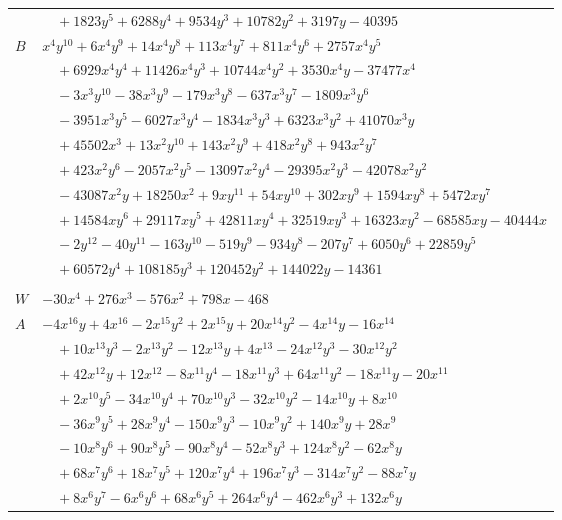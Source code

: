 \documentclass[11pt]{article}
\begin{document}
\begin{longtable}{@{}ll@{}}
 & $\quad +1823y^{5}+6288y^{4}+9534y^{3}+10782y^{2}+3197y-40395$\\
$B$ & $x^{4}y^{10}+6x^{4}y^{9}+14x^{4}y^{8}+113x^{4}y^{7}+811x^{4}y^{6}+2757x^{4}y^{5}$\\
 & $\quad +6929x^{4}y^{4}+11426x^{4}y^{3}+10744x^{4}y^{2}+3530x^{4}y-37477x^{4}$\\
 & $\quad -3x^{3}y^{10}-38x^{3}y^{9}-179x^{3}y^{8}-637x^{3}y^{7}-1809x^{3}y^{6}$\\
 & $\quad -3951x^{3}y^{5}-6027x^{3}y^{4}-1834x^{3}y^{3}+6323x^{3}y^{2}+41070x^{3}y$\\
 & $\quad +45502x^{3}+13x^{2}y^{10}+143x^{2}y^{9}+418x^{2}y^{8}+943x^{2}y^{7}$\\
 & $\quad +423x^{2}y^{6}-2057x^{2}y^{5}-13097x^{2}y^{4}-29395x^{2}y^{3}-42078x^{2}y^{2}$\\
 & $\quad -43087x^{2}y+18250x^{2}+9xy^{11}+54xy^{10}+302xy^{9}+1594xy^{8}+5472xy^{7}$\\
 & $\quad +14584xy^{6}+29117xy^{5}+42811xy^{4}+32519xy^{3}+16323xy^{2}-68585xy-40444x$\\
 & $\quad -2y^{12}-40y^{11}-163y^{10}-519y^{9}-934y^{8}-207y^{7}+6050y^{6}+22859y^{5}$\\
 & $\quad +60572y^{4}+108185y^{3}+120452y^{2}+144022y-14361$\\
\addlinespace[3pt]
\multicolumn{2}{@{}l}{$g=2$, $i=9$, $m=1$, neighbours $44,4,6,20,23,24,27,30,35,36,38,39,41$}\\
$W$ & $-30x^{4}+276x^{3}-576x^{2}+798x-468$\\
$A$ & $-4x^{16}y+4x^{16}-2x^{15}y^{2}+2x^{15}y+20x^{14}y^{2}-4x^{14}y-16x^{14}$\\
 & $\quad +10x^{13}y^{3}-2x^{13}y^{2}-12x^{13}y+4x^{13}-24x^{12}y^{3}-30x^{12}y^{2}$\\
 & $\quad +42x^{12}y+12x^{12}-8x^{11}y^{4}-18x^{11}y^{3}+64x^{11}y^{2}-18x^{11}y-20x^{11}$\\
 & $\quad +2x^{10}y^{5}-34x^{10}y^{4}+70x^{10}y^{3}-32x^{10}y^{2}-14x^{10}y+8x^{10}$\\
 & $\quad -36x^{9}y^{5}+28x^{9}y^{4}-150x^{9}y^{3}-10x^{9}y^{2}+140x^{9}y+28x^{9}$\\
 & $\quad -10x^{8}y^{6}+90x^{8}y^{5}-90x^{8}y^{4}-52x^{8}y^{3}+124x^{8}y^{2}-62x^{8}y$\\
 & $\quad +68x^{7}y^{6}+18x^{7}y^{5}+120x^{7}y^{4}+196x^{7}y^{3}-314x^{7}y^{2}-88x^{7}y$\\
 & $\quad +8x^{6}y^{7}-6x^{6}y^{6}+68x^{6}y^{5}+264x^{6}y^{4}-462x^{6}y^{3}+132x^{6}y$\\

\end{longtable}
\end{document}
